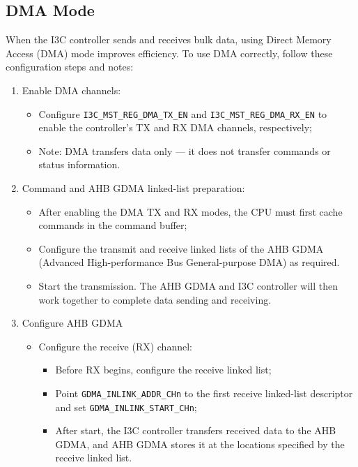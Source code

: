 \documentclass[main\_\_EN.tex]{subfiles}
\begin{document}
\subsection{DMA Mode}

When the I3C controller sends and receives bulk data, using Direct Memory Access (DMA) mode improves efficiency. To use DMA correctly, follow these configuration steps and notes:

\begin{enumerate}
    \item Enable DMA channels:
    \begin{itemize}
        \item Configure \texttt{I3C\_MST\_REG\_DMA\_TX\_EN} and \texttt{I3C\_MST\_REG\_DMA\_RX\_EN} to enable the controller's TX and RX DMA channels, respectively;
        \item Note: DMA transfers data only — it does not transfer commands or status information.
    \end{itemize}

    \item Command and AHB GDMA linked-list preparation:
    \begin{itemize}
        \item After enabling the DMA TX and RX modes, the CPU must first cache commands in the command buffer;
        \item Configure the transmit and receive linked lists of the AHB GDMA (Advanced High-performance Bus General-purpose DMA) as required.
        \item Start the transmission. The AHB GDMA and I3C controller will then work together to complete data sending and receiving.
    \end{itemize}

    \item Configure AHB GDMA
    \begin{itemize}
        \item Configure the receive (RX) channel:
        \begin{itemize}
            \item Before RX begins, configure the receive linked list;
            \item Point \texttt{GDMA\_INLINK\_ADDR\_CHn} to the first receive linked-list descriptor and set \texttt{GDMA\_INLINK\_START\_CHn};
            \item After start, the I3C controller transfers received data to the AHB GDMA, and AHB GDMA stores it at the locations specified by the receive linked list.
        \end{itemize}


\end{itemize}
\end{enumerate}
\end{document}
